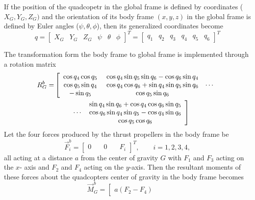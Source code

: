 \documentclass[twocolumn,10pt]{asme2e}
\begin{document}
If the position of the quadcopetr in the global frame is  defined by coordinates ($X_G, Y_{G}, Z_{G})$ and the orientation of its body frame $(x,y,z)$ in the global frame is  defined by Euler  angles ($\psi,\theta,\phi$), then  its generalized coordinates  become
\begin{equation}
q=[\begin{array}{cccccc}
X_{G} & Y_{G} & Z_{G} & \psi & \theta & \phi\end{array}]^T= [\begin{array}{cccccc}
q_{1} & q_{2} & q_{3} & q_4 & q_5 & q_6\end{array}]^T
\end{equation}

The transformation form the body frame to global frame is implemented through a rotation matrix
{\small
\begin{align}
	R^b_G=&
	\left[\begin{array}{ccc} \cos{q_{4}}\cos{q_{5}} &~ \cos{q_{4}}\sin{q_{5}}\sin{q_{6}}-\cos{q_{6}}\sin{q_{4}} & \\ 
		\cos{q_{5}}\sin{q_{4}} & ~\cos{q_{4}}\cos{q_{6}}+\sin{q_{4}}\sin{q_{5}}\sin{q_{6}} & \cdots\\ 
		-\sin{q_{5}} & ~\cos{q_{5}}\sin{q_{6}} &  \end{array}\right.\notag\\
&\qquad	
\left.\begin{array}{cc}
&\sin{q_{4}}\sin{q_{6}}+\cos{q_{4}}\cos{q_{6}}\sin{q_{5}}\\
\cdots&\cos{q_{6}}\sin{q_{4}}\sin{q_{5}}-\cos{q_{4}}\sin{q_{6}}\\
&\cos{q_{5}}\cos{q_{6}}\end{array}\right]
\end{align}
Let the four forces produced by the thrust propellers in the body frame be
\begin{equation}
\vec{F}_{i}^b=\left[\begin{array}{ccc}
	0&\quad
	0&\quad
	F_{i}
\end{array}\right]^T,\qquad i=1,2,3,4,
\end{equation}
all acting at a distance $a$ from the center of gravity $G$ with $F_1$ and $F_3$ acting on the $x$- axis and $F_2$ and $F_4$ acting on the $y$-axis. Then the resultant moments of these forces about the quadcopters center of gravity in the body frame becomes 
\begin{equation}
	\vec{M}^b_G=\left[\begin{array}{ccc}
		a\left(F_{2}-F_{4}\right)&\quad

\end{array}
\end{equation}}
\end{document}
